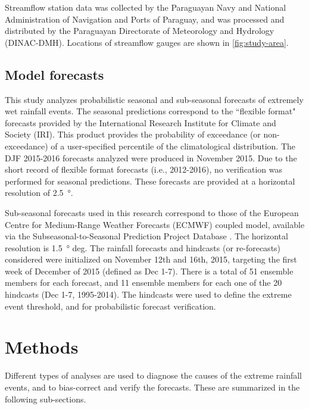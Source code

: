 \documentclass{ametsoc}
\begin{document}
Streamflow station data was collected by the Paraguayan Navy and National Administration of Navigation and Ports of Paraguay, and was processed and distributed by the Paraguayan Directorate of Meteorology and Hydrology (DINAC-DMH).
Locations of streamflow gauges are shown in \cref{fig:study-area}.

\subsection{Model forecasts}
This study analyzes probabilistic seasonal and sub-seasonal forecasts of extremely wet rainfall events.
The seasonal predictions correspond to the ``flexible format" forecasts provided by the International Research Institute for Climate and Society (IRI).
This product provides the probability of exceedance (or non-exceedance) of a user-specified percentile of the climatological distribution.
The DJF 2015-2016 forecasts analyzed were produced in November 2015.
Due to the short record of flexible format forecasts (i.e., 2012-2016), no verification was performed for seasonal predictions.
These forecasts are provided at a horizontal resolution of \SI{2.5}{\degree}.

Sub-seasonal forecasts used in this research correspond to those of the European Centre for Medium-Range Weather Forecasts (ECMWF) coupled model, available via the Subseasonal-to-Seasonal Prediction Project Database \citep{Vitart2016}.
The horizontal resolution is \SI{1.5}{\degree} deg.
The rainfall forecasts and hindcasts (or re-forecasts) considered were initialized on November 12th and 16th, 2015, targeting the first week of December of 2015 (defined as Dec 1-7).
There is a total of 51 ensemble members for each forecast, and 11 ensemble members for each one of the 20 hindcasts (Dec 1-7, 1995-2014).
The hindcasts were used to define the extreme event threshold, and for probabilistic forecast verification.


\section{Methods} \label{sec:methods}

Different types of analyses are used to diagnose the causes of the extreme rainfall events, and to bias-correct and verify the forecasts.
These are summarized in the following sub-sections.
\end{document}
